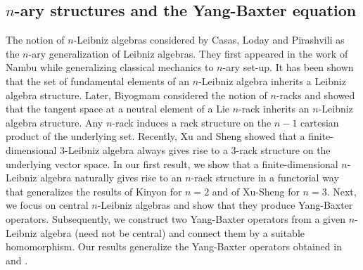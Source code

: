 \documentclass[a4paper,reqno,10pt]{amsart}
\theoremstyle{plain}
\theoremstyle{definition}
\theoremstyle{remark}
\begin{document}



    




\subsection{$n$-ary structures and the Yang-Baxter equation} The notion of $n$-Leibniz algebras considered by Casas, Loday and Pirashvili \cite{casas1} as the $n$-ary generalization of Leibniz algebras. They first appeared in the work of Nambu \cite{nambu} while generalizing classical mechanics to $n$-ary set-up. It has been shown that the set of fundamental elements of an $n$-Leibniz algebra inherits a Leibniz algebra structure. Later, Biyogmam \cite{biyog} considered the notion of $n$-racks and showed that the tangent space at a neutral element of a Lie $n$-rack inherits an $n$-Leibniz algebra structure. Any $n$-rack induces a rack structure on the $n-1$ cartesian product of the underlying set. Recently, Xu and Sheng \cite{xu-sheng} showed that a finite-dimensional $3$-Leibniz algebra always gives rise to a $3$-rack structure on the underlying vector space. In our first result, we show that a finite-dimensional $n$-Leibniz algebra naturally gives rise to an $n$-rack structure in a functorial way that generalizes the results of Kinyon \cite{kinyon} for $n=2$ and of Xu-Sheng \cite{xu-sheng} for $n=3$. Next, we focus on central $n$-Leibniz algebras and show that they produce Yang-Baxter operators. Subsequently, we construct two Yang-Baxter operators from a given $n$-Leibniz algebra (need not be central) and connect them by a suitable homomorphism. Our results generalize the Yang-Baxter operators obtained in \cite{xu-sheng} and \cite{abramov}.

\medskip
\end{document}
